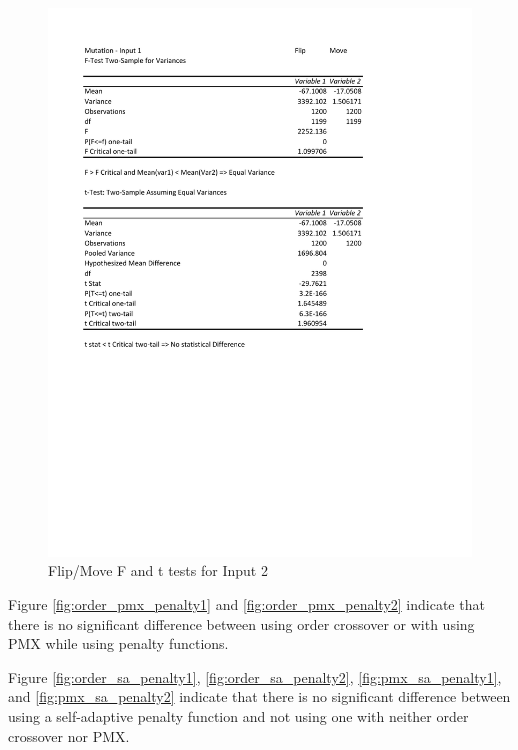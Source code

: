 \documentclass[times]{article}
\begin{document}
	\begin{figure}
		\caption{Flip/Move F and t tests for Input 2}
		\label{fig:mutation2}
		\includegraphics[width=\textwidth]{./t_test/Mutation1}
	\end{figure}


	Figure \ref{fig:order_pmx_penalty1} and \ref{fig:order_pmx_penalty2} indicate that there is no significant difference between using order crossover or with using PMX while using penalty functions.

	Figure \ref{fig:order_sa_penalty1}, \ref{fig:order_sa_penalty2}, \ref{fig:pmx_sa_penalty1}, and \ref{fig:pmx_sa_penalty2} indicate that there is no significant difference between using a self-adaptive penalty function and not using one with neither order crossover nor PMX.
\end{document}
